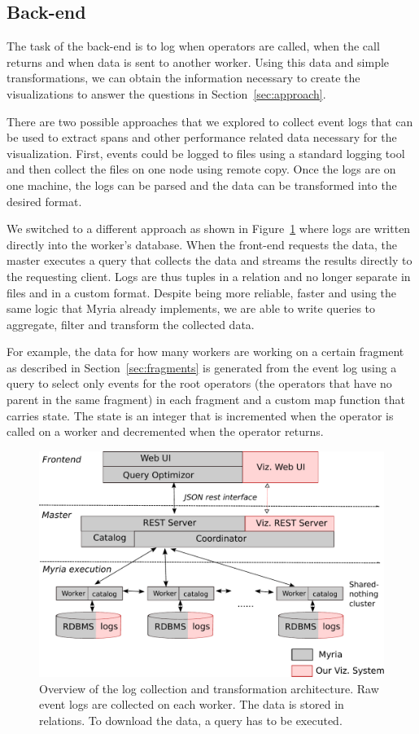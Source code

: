 \documentclass{chi2009}
\begin{document}
\subsection{Back-end}
\label{sec:back}

The task of the back-end is to log when operators are called, when the call returns and when data is sent to another worker. Using this data and simple transformations, we can obtain the information necessary to create the visualizations to answer the questions in Section~\ref{sec:approach}.

There are two possible approaches that we explored to collect event logs that can be used to extract spans and other performance related data necessary for the visualization. First, events could be logged to files using a standard logging tool and then collect the files on one node using remote copy. Once the logs are on one machine, the logs can be parsed and the data can be transformed into the desired format.

We switched to a different approach as shown in Figure~\ref{fig:arch} where logs are written directly into the worker's database. When the front-end requests the data, the master executes a query that collects the data and streams the results directly to the requesting client. Logs are thus tuples in a relation and no longer separate in files and in a custom format. Despite being more reliable, faster and using the same logic that Myria already implements, we are able to write queries to aggregate, filter and transform the collected data.

For example, the data for how many workers are working on a certain fragment as described in Section~\ref{sec:fragments} is generated from the event log using a query to select only events for the root operators (the operators that have no parent in the same fragment) in each fragment and a custom map function that carries state. The state is an integer that is incremented when the operator is called on a worker and decremented when the operator returns.

\begin{figure}[ht]
  \includegraphics[width=\columnwidth]{images/viz_arch}
  \caption{Overview of the log collection and transformation architecture. Raw event logs are collected on each worker. The data is stored in relations. To download the data, a query has to be executed.}
  \label{fig:arch}
\end{figure}
\end{document}
